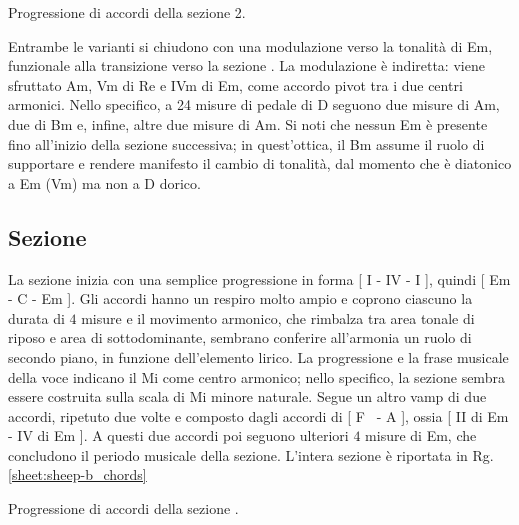 \documentclass[class=book, crop=false, oneside, 12pt]{standalone}
\begin{document}
    \begin{sheet}[htb]
        \centering
        \caption{Progressione di accordi della sezione 2.}
        \label{sheet:sheep-a2_chords}
    \end{sheet}

    Entrambe le varianti si chiudono con una modulazione verso la tonalità di Em, funzionale alla transizione verso la sezione . La modulazione è indiretta: viene sfruttato Am, Vm di Re e IVm di Em,  come accordo pivot tra i due centri armonici. Nello specifico, a 24 misure di pedale di D seguono due misure di Am, due di Bm e, infine, altre due misure di Am. Si noti che nessun Em è presente fino all'inizio della sezione successiva; in quest'ottica,  il Bm assume il ruolo di supportare e rendere manifesto il cambio di tonalità, dal momento che è diatonico a Em (Vm) ma non a D dorico. 

    \subsection{Sezione }
    La sezione  inizia con una semplice progressione in forma [ I - IV - I ], quindi [ Em - C - Em ]. Gli accordi hanno un respiro molto ampio e coprono ciascuno la durata di \(4\) misure e il movimento armonico, che rimbalza tra area tonale di riposo e area di sottodominante, sembrano conferire all'armonia un ruolo di secondo piano, in funzione dell'elemento lirico. La progressione e la frase musicale della voce indicano il Mi come centro armonico; nello specifico, la sezione sembra essere costruita sulla scala di Mi minore naturale.
    Segue un altro vamp di due accordi, ripetuto due volte e composto dagli accordi di [ F\sharp~ - A ], ossia [ II di Em - IV di Em ].  A questi due accordi poi seguono ulteriori \(4\) misure di Em, che concludono il periodo musicale della sezione. L'intera sezione è riportata in Rg.\ref{sheet:sheep-b_chords}

    \begin{sheet}[htb]
        \centering
        \caption{Progressione di accordi della sezione .}
        \label{sheet:sheep-b_chords}
    \end{sheet}
    
\end{document}
